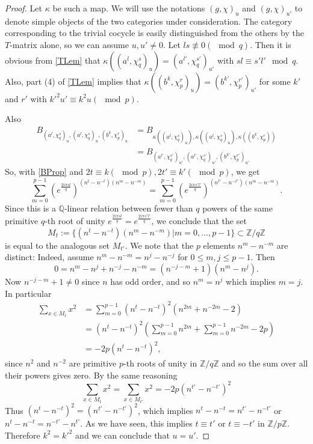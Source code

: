 \documentclass[a4paper, 10pt]{book}
\theoremstyle{definition}
\numberwithin{equation}{chapter}
\newcommand\ZZ{\mathbb Z}
\begin{document}
\begin{proof}
  Let $\kappa$ be such a map. We will use the notations $(g,\chi)_u$ and $(g,\chi)_{u'}$ to denote simple objects of the two categories under consideration. The category corresponding to the trivial cocycle is easily distinguished from the others by the $T$-matrix alone, so we can assume $u,u'\neq 0$. Let $ls\not\equiv 0(\mod q)$. Then it is obvious from \cref{TLem} that $\kappa((a^l,\chi_q^s)_u)=(a^{l'},\chi_q^{s'})_{u'}$ with $sl \equiv s'l' \mod q$. Also, part (4) of \ref{TLem} implies that $\kappa((b^k,\chi_p^r)_u)=(b^{k'},\chi_p^{r'})_{u'}$ for some $k'$ and $r'$ with $k'^2u'\equiv k^2u(\mod p)$.

Also
\begin{align*}
B_{(a^l,\chi_q^s)_u,(a^l, \chi_q^s)_u,(b^k, \chi_p^r)_u} &= B_{\kappa((a^l,\chi_q^s)_u),\kappa((a^l, \chi_q^s)_u),\kappa((b^k, \chi_p^r))}\\
&= B_{(a^{l'},\chi_q^{s'})_{u'},(a^{l'},\chi_q^{s'})_{u'},(b^{k'}, \chi_p^{r'})_{u'}}
\end{align*}
So, with \cref{BProp} and $2t\equiv k(\mod p), 2t'\equiv k'(\mod p)$, we get
\begin{equation}\label{sumroots}
\sum_{m=0}^{p-1} \left(e^{\frac{2i\pi sl} {q} }\right)^{(n^t-n^{-t})(n^{m}-n^{-m})} = \sum_{m=0}^{p-1} \left(e^{\frac{2i\pi s'l'} {q} }\right)^{(n^{t'}-n^{-t'})(n^{m}-n^{-m})}.
\end{equation}
Since this is a $\mathbb Q$-linear relation between fewer than $q$ powers of the same primitive $q$-th root of unity $e^{\frac{2i\pi sl} {q} }=e^{\frac{2i\pi s'l'} {q}}$, we conclude that the set 
\begin{equation*}
  M_t:=\{(n^t-n^{-t})(n^{m}-n^{-m})|m=0,\dots,p-1\}\subset\ZZ/q\ZZ
\end{equation*}
is equal to the analogous set $M_{t'}$. We note that the $p$ elements $n^m-n^{-m}$ are distinct: Indeed, assume $n^m-n^{-m}=n^j-n^{-j}$ for $0\leq m,j\leq p-1$. Then
  \begin{equation*}
    0=n^m-n^j+n^{-j}-n^{-m}=(n^{-j-m}+1)(n^m-n^j).
  \end{equation*}
 Now $n^{-j-m}+1\neq 0$ since $n$ has odd order, and so $n^m=n^j$ which implies $m=j$. In particular
\begin{align*}
  \sum_{x\in M_t}x^2&=\sum_{m=0}^{p-1}(n^{t}-n^{-t})^2(n^{2m}+n^{-2m}-2)\\
                  &=(n^{t}-n^{-t})^2\left(\sum_{m=0}^{p-1}n^{2m}+\sum_{m=0}^{p-1}n^{-2m}-2p\right)\\
  &=-2p(n^{t}-n^{-t})^2,
\end{align*}
since $n^2$ and $n^{-2}$ are primitive $p$-th roots of unity in $\ZZ/q\ZZ$
and so the sum over all their powers gives zero. By the same reasoning
\begin{equation*}
  \sum_{x\in M_t}x^2=\sum_{x\in M_{t'}}x^2=-2p(n^{t'}-n^{-t'})^2
\end{equation*}
Thus $(n^t-n^{-t})^2=(n^{t'}-n^{-t'})^2$, which implies $n^t-n^{-t}=n^{t'}-n^{-t'}$ or $n^t-n^{-t}=n^{-t'}-n^{t'}$. As we have seen, this implies $t\equiv t'$ or $t\equiv -t'$ in $\ZZ/p\ZZ$. Therefore $k^2=k'^2$ and we can conclude that $u=u'$.
\end{proof}
\end{document}
